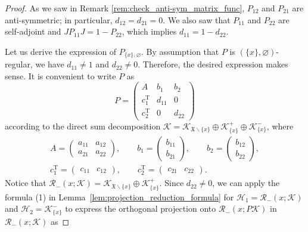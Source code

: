 \documentclass[pdftex]{sigma}
\numberwithin{equation}{section}
\newcommand{\mfrak}[1]{\mathfrak{#1}}
\newcommand{\mcal}[1]{\mathcal{#1}}
\newcommand{\mrm}[1]{\mathrm{#1}}
\begin{document}
\begin{proof}
As we saw in Remark \ref{rem:check_anti-sym_matrix_func}, $P_{12}$ and $P_{21}$ are anti-symmetric; in particular, $d_{12}=d_{21}=0$. We also saw that $P_{11}$ and $P_{22}$ are self-adjoint and $JP_{11}J=1-P_{22}$, which implies $d_{11}=1-d_{22}$.

Let us derive the expression of $P_{\{x\},\varnothing}$. By assumption that $P$ is $(\{x\},\varnothing)$-regular, we have $d_{11}\neq 1$ and $d_{22}\neq 0$. Therefore, the desired expression makes sense. It is convenient to write $P$ as
\begin{equation*}
	P=\left(
	\begin{matrix}
	A & b_{1} & b_{2} \\
	c_{1}^{\mrm{T}} & d_{11} & 0 \\
	c_{2}^{\mrm{T}} & 0 & d_{22}
	\end{matrix}
	\right)
\end{equation*}
according to the direct sum decomposition $\mcal{K}=\mcal{K}_{\mfrak{X}\backslash \{x\}}\oplus \mcal{K}_{\{x\}}^{+}\oplus \mcal{K}_{\{x\}}^{-}$, where
\begin{gather*}
	A =\left(
	\begin{matrix}
		a_{11} & a_{12} \\
		a_{21} & a_{22}
	\end{matrix}
	\right), \qquad
	b_{1} =\left(
	\begin{matrix}
		b_{11} \\
		b_{21}
	\end{matrix}
	\right), \qquad
	b_{2} =\left(
	\begin{matrix}
		b_{12} \\
		b_{22}
	\end{matrix}
	\right), \\
	c_{1}^{\mrm{T}} =\left(
	\begin{matrix}
		c_{11} & c_{12}
	\end{matrix}
	\right), \qquad
	c_{2}^{\mrm{T}} =\left(
	\begin{matrix}
		c_{21} & c_{22}
	\end{matrix}
	\right).
\end{gather*}
Notice that $\mcal{R}_{-}(x;\mcal{K})=\mcal{K}_{\mfrak{X}\backslash\{x\}}\oplus \mcal{K}_{\{x\}}^{+}$.
Since $d_{22}\neq 0$, we can apply the formula (1) in Lemma~\ref{lem:projection_reduction_formula} for $\mcal{H}_{1}=\mcal{R}_{-}(x;\mcal{K})$ and $\mcal{H}_{2}=\mcal{K}_{\{x\}}^{-}$ to express the orthogonal projection onto $\mcal{R}_{-}(x;P\mcal{K})$ in $\mcal{R}_{-}(x;\mcal{K})$ as

\end{proof}
\end{document}
